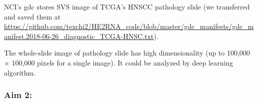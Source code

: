 \documentclass[12pt, a4paper]{article}
\begin{document}

NCI's \acrfull{gdc} stores SVS image of TCGA's HNSCC pathology slide (we transferred and saved them at \url{https://github.com/texchi2/HE2RNA_code/blob/master/gdc_manifests/gdc_manifest.2018-06-26_diagnostic_TCGA-HNSC.txt}).



The whole-slide image of pathology slide has high dimensionality (up to 100,000 × 100,000 pixels for a single image). It could be analyzed by deep learning algorithm.



\clearpage

\subsubsection*{Aim 2:}\\[0.5cm]






\clearpage


\end{document}
